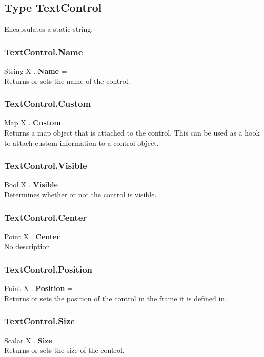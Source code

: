 \documentclass[10pt]{book}
\begin{document}
\subsection{Type TextControl \label{T:TextControl}}
Encapsulates a static string.

\subsubsection{TextControl.Name \label{F:TextControl:Name}}
String X . \textbf{Name} = \\
Returns or sets the name of the control.

\subsubsection{TextControl.Custom \label{F:TextControl:Custom}}
Map X . \textbf{Custom} = \\
Returns a map object that is attached to the control. This can be used as a hook to attach custom information to a control object.

\subsubsection{TextControl.Visible \label{F:TextControl:Visible}}
Bool X . \textbf{Visible} = \\
Determines whether or not the control is visible.

\subsubsection{TextControl.Center \label{F:TextControl:Center}}
Point X . \textbf{Center} = \\
No description

\subsubsection{TextControl.Position \label{F:TextControl:Position}}
Point X . \textbf{Position} = \\
Returns or sets the position of the control in the frame it is defined in.

\subsubsection{TextControl.Size \label{F:TextControl:Size}}
Scalar X . \textbf{Size} = \\
Returns or sets the size of the control.
\end{document}
